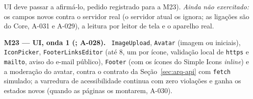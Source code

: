 UI deve passar a afirmá-lo, pedido registrado para a M23). \emph{Ainda não exercitado:} os campos novos contra o servidor real (o servidor atual os ignora; as ligações são do Core, A-031 e A-029), a leitura por leitor de tela e o aparelho real.

\textbf{M23 --- UI, onda 1 (; A-028).} \ \texttt{ImageUpload}, \texttt{Avatar} (imagem ou iniciais), \texttt{IconPicker}, \texttt{FooterLinksEditor} (até 8, um por ícone, validação local de \texttt{https} e \texttt{mailto}, aviso do e-mail público), \texttt{Footer} (com os ícones do Simple Icons \emph{inline}) e a moderação do avatar, contra o contrato da Seção~\ref{sec:arq-api} com \texttt{fetch} simulado; a varredura de acessibilidade continua com zero violações e ganha os estados novos (quando as páginas os montarem, A-030).

